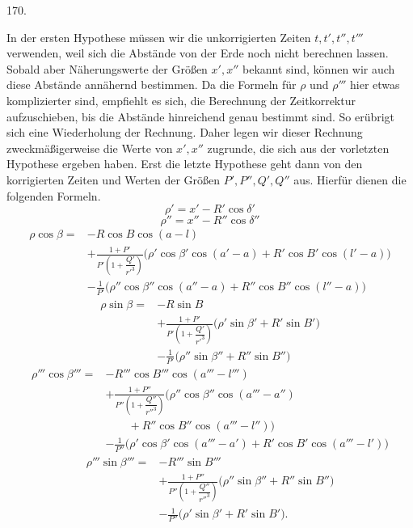\par{}\medskip
\begin{center}\hypertarget{native-235-article170}{}170.\end{center}
In der ersten Hypothese müssen wir die unkorrigierten Zeiten $t,t',t'',t'''$ verwenden, weil sich die Abstände von der Erde noch nicht berechnen lassen. Sobald aber Näherungswerte der Größen $x',x''$ bekannt sind, können wir auch diese Abstände annähernd bestimmen. Da die Formeln für $\rho$ und $\rho'''$ hier etwas komplizierter sind, empfiehlt es sich, die Berechnung der Zeitkorrektur aufzuschieben, bis die Abstände hinreichend genau bestimmt sind. So erübrigt sich eine Wiederholung der Rechnung. Daher legen wir dieser Rechnung zweckmäßigerweise die Werte von $x',x''$ zugrunde, die sich aus der vorletzten Hypothese ergeben haben. Erst die letzte Hypothese geht dann von den korrigierten Zeiten und Werten der Größen $P',P'',Q',Q''$ aus. Hierfür dienen die folgenden Formeln.
\[
\tag*{VII.}
\rho'=x'-R'\cos\delta'
\]
\[
\tag*{VIII.}
\rho''=x''-R''\cos\delta''
\]
\[
\tag*{IX.}
\begin{aligned}
\rho\cos\beta={}&-R\cos B\cos(a-l)\\
&+\frac{1+P'}{P'\left(1+\dfrac{Q'}{r'^3}\right)}\bigl(\rho'\cos\beta'\cos(a'-a)+R'\cos B'\cos(l'-a)\bigr)\\
&-\frac{1}{P'}\bigl(\rho''\cos\beta''\cos(a''-a)+R''\cos B''\cos(l''-a)\bigr)
\end{aligned}
\]
\[
\tag*{X.}
\begin{aligned}
\rho\sin\beta={}&-R\sin B\\
&+\frac{1+P'}{P'\left(1+\dfrac{Q'}{r'^3}\right)}\bigl(\rho'\sin\beta'+R'\sin B'\bigr)\\
&-\frac{1}{P'}\bigl(\rho''\sin\beta''+R''\sin B''\bigr)
\end{aligned}
\]
\[
\tag*{XI.}
\begin{aligned}
\rho'''\cos\beta'''={}&-R'''\cos B'''\cos(a'''-l''')\\
&+\frac{1+P''}{P''\left(1+\dfrac{Q''}{r''^3}\right)}\bigl(\rho''\cos\beta''\cos(a'''-a'')\\
&\qquad{}+R''\cos B''\cos(a'''-l'')\bigr)\\
&-\frac{1}{P''}\bigl(\rho'\cos\beta'\cos(a'''-a')+R'\cos B'\cos(a'''-l')\bigr)
\end{aligned}
\]
\[
\tag*{XII.}
\begin{aligned}
\rho'''\sin\beta'''={}&-R'''\sin B'''\\
&+\frac{1+P''}{P''\left(1+\dfrac{Q''}{r''^3}\right)}\bigl(\rho''\sin\beta''+R''\sin B''\bigr)\\
&-\frac{1}{P''}\bigl(\rho'\sin\beta'+R'\sin B'\bigr).
\end{aligned}
\]
